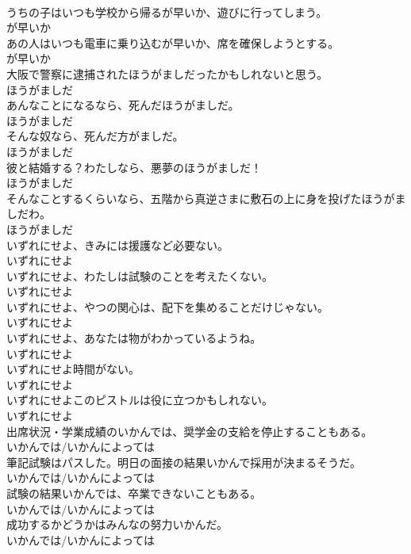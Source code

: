\documentclass[8pt]{extreport}
\begin{document}
\begin{CJK}{UTF8}{min}
\\	うちの子はいつも学校から帰るが早いか、遊びに行ってしまう。	
\\	が早いか
\\	あの人はいつも電車に乗り込むが早いか、席を確保しようとする。	
\\	が早いか
\\	大阪で警察に逮捕されたほうがましだったかもしれないと思う。	
\\	ほうがましだ
\\	あんなことになるなら、死んだほうがましだ。	
\\	ほうがましだ
\\	そんな奴なら、死んだ方がましだ。	
\\	ほうがましだ
\\	彼と結婚する？わたしなら、悪夢のほうがましだ！	
\\	ほうがましだ
\\	そんなことするくらいなら、五階から真逆さまに敷石の上に身を投げたほうがましだわ。	
\\	ほうがましだ
\\	いずれにせよ、きみには援護など必要ない。	
\\	いずれにせよ
\\	いずれにせよ、わたしは試験のことを考えたくない。	
\\	いずれにせよ
\\	いずれにせよ、やつの関心は、配下を集めることだけじゃない。	
\\	いずれにせよ
\\	いずれにせよ、あなたは物がわかっているようね。	
\\	いずれにせよ
\\	いずれにせよ時間がない。	
\\	いずれにせよ
\\	いずれにせよこのピストルは役に立つかもしれない。	
\\	いずれにせよ
\\	出席状況・学業成績のいかんでは、奨学金の支給を停止することもある。	
\\	いかんでは/いかんによっては
\\	筆記試験はパスした。明日の面接の結果いかんで採用が決まるそうだ。	
\\	いかんでは/いかんによっては
\\	試験の結果いかんでは、卒業できないこともある。	
\\	いかんでは/いかんによっては
\\	成功するかどうかはみんなの努力いかんだ。	
\\	いかんでは/いかんによっては

\end{CJK}
\end{document}

